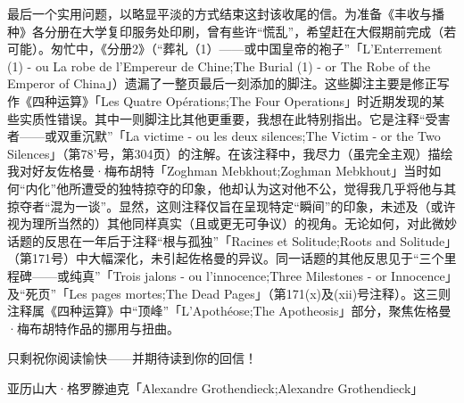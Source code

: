 最后一个实用问题，以略显平淡的方式结束这封该收尾的信。为准备《丰收与播种》各分册在大学复印服务处印刷，曾有些许“慌乱”，希望赶在大假期前完成（若可能）。匆忙中，《分册2》（“葬礼（1）——或中国皇帝的袍子”「L'Enterrement (1) - ou La robe de l'Empereur de Chine;The Burial (1) - or The Robe of the Emperor of China」）遗漏了一整页最后一刻添加的脚注。这些脚注主要是修正写作《四种运算》「Les Quatre Opérations;The Four Operations」时近期发现的某些实质性错误。其中一则脚注比其他更重要，我想在此特别指出。它是注释“受害者——或双重沉默”「La victime - ou les deux silences;The Victim - or the Two Silences」（第78'号，第304页）的注解。在该注释中，我尽力（虽完全主观）描绘我对好友佐格曼·梅布胡特「Zoghman Mebkhout;Zoghman Mebkhout」当时如何“内化”他所遭受的独特掠夺的印象，他却认为这对他不公，觉得我几乎将他与其掠夺者“混为一谈”。显然，这则注释仅旨在呈现特定“瞬间”的印象，未述及（或许视为理所当然的）其他同样真实（且或更无可争议）的视角。无论如何，对此微妙话题的反思在一年后于注释“根与孤独”「Racines et Solitude;Roots and Solitude」（第171号）中大幅深化，未引起佐格曼的异议。同一话题的其他反思见于“三个里程碑——或纯真”「Trois jalons - ou l'innocence;Three Milestones - or Innocence」及“死页”「Les pages mortes;The Dead Pages」（第171(x)及(xii)号注释）。这三则注释属《四种运算》中“顶峰”「L'Apothéose;The Apotheosis」部分，聚焦佐格曼·梅布胡特作品的挪用与扭曲。

只剩祝你阅读愉快——并期待读到你的回信！

\hfill 亚历山大·格罗滕迪克「Alexandre Grothendieck;Alexandre Grothendieck」
